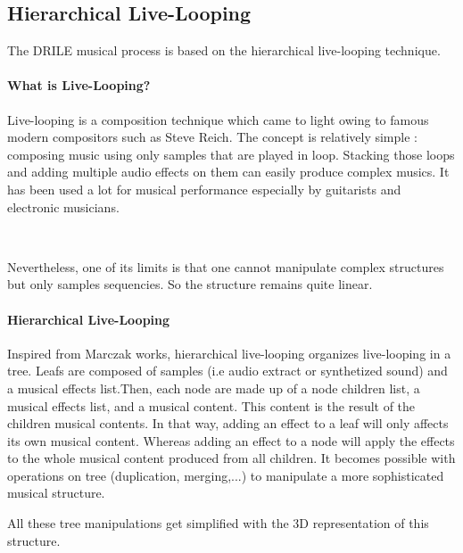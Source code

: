 \subsection{Hierarchical Live-Looping}

The DRILE musical process is based on the hierarchical live-looping technique.

\paragraph{What is Live-Looping?}

Live-looping is a composition technique which came to light owing to famous modern compositors such as Steve Reich.
The concept is relatively simple : composing music using only samples that are played in loop. Stacking those loops and adding multiple audio effects on them can easily produce complex musics.
It has been used a lot for musical performance especially by guitarists and electronic musicians.

~

Nevertheless, one of its limits is that one cannot manipulate complex structures but only samples sequencies. So the structure remains quite linear.

\paragraph{Hierarchical Live-Looping}

Inspired from Marczak \cite{marczak2007etude} works, hierarchical live-looping organizes live-looping in a tree. Leafs are composed of samples (i.e audio extract or synthetized sound) and a musical effects list.Then, each node are made up of a node children list, a musical effects list, and a musical content. This content is the result of the children musical contents.
In that way, adding an effect to a leaf will only affects its own musical content. Whereas adding an effect to a node will apply the effects to the whole musical content produced from all children. It becomes possible with operations on tree (duplication, merging,...) to manipulate a more sophisticated musical structure. 

All these tree manipulations get simplified with the 3D representation of this structure.

